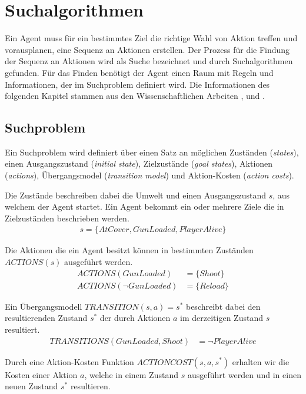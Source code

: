 \chapter{Suchalgorithmen}

Ein Agent muss für ein bestimmtes Ziel die richtige Wahl von Aktion treffen und vorausplanen, eine Sequenz an Aktionen erstellen. Der Prozess für die Findung der Sequenz an Aktionen wird als Suche bezeichnet und durch Suchalgorithmen gefunden. Für das Finden benötigt der Agent einen Raum mit Regeln und Informationen, der im Suchproblem definiert wird. Die Informationen des folgenden Kapitel stammen aus den Wissenschaftlichen Arbeiten \autocite{RN2020}, \autocite{4082128} und \autocite{Felner2011}.

\section{Suchproblem}

Ein Suchproblem wird definiert über einen Satz an möglichen Zuständen (\textit{states}), einen Ausgangszustand (\textit{initial state}), Zielzustände (\textit{goal states}), Aktionen (\textit{actions}), Übergangsmodel (\textit{transition model}) und Aktion-Kosten (\textit{action costs}).

Die Zustände beschreiben dabei die Umwelt und einen Ausgangszustand $s$, aus welchem der Agent startet. Ein Agent bekommt ein oder mehrere Ziele die in Zielzuständen beschrieben werden.
\begin{align*}
s = \{AtCover, GunLoaded, PlayerAlive\}
\end{align*}

Die Aktionen die ein Agent besitzt können in bestimmten Zuständen $ACTIONS(s)$ ausgeführt werden.
\begin{align*}
ACTIONS(GunLoaded) &= \{Shoot\} \\
ACTIONS(\lnot GunLoaded) &= \{Reload\}
\end{align*}

Ein Übergangsmodell $TRANSITION(s,a) = s^*$ beschreibt dabei den resultierenden Zustand $s^*$ der durch Aktionen $a$ im derzeitigen Zustand $s$ resultiert.
\begin{align*}
TRANSITIONS(GunLoaded, Shoot) &= \lnot PlayerAlive
\end{align*}

Durch eine Aktion-Kosten Funktion $ACTIONCOST(s,a,s^*)$ erhalten wir die Kosten einer Aktion $a$, welche in einem Zustand $s$ ausgeführt werden und in einen neuen Zustand $s^*$ resultieren.

